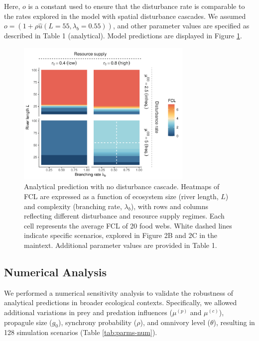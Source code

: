 \documentclass[11pt, class=article, crop=false]{standalone}
\begin{document}
Here, $o$ is a constant used to ensure that the disturbance rate is comparable to the rates explored in the model with spatial disturbance cascades.
We assumed $o = (1 + \rho \hat{u}(L = 55, \lambda_b = 0.55))$, and other parameter values are specified as described in Table 1 (analytical).
Model predictions are displayed in Figure \ref{fig:no-cascade}.

\begin{figure}
\centering
\includegraphics[width=0.75\textwidth]{../data_fmt/fig_rho0.pdf}
\caption{Analytical prediction with no disturbance cascade. Heatmaps of
FCL are expressed as a function of ecosystem size (river length, \(L\))
and complexity (branching rate, \(\lambda_b\)), with rows and columns
reflecting different disturbance and resource supply regimes. Each cell
represents the average FCL of 20 food webs. White dashed lines indicate
specific scenarios, explored in Figure 2B and 2C in the maintext.
Additional parameter values are provided in Table 1.}
\label{fig:no-cascade}
\end{figure}

\newpage

\subsection{Numerical Analysis}

We performed a numerical sensitivity analysis to validate the robustness of analytical predictions in broader ecological contexts.
Specifically, we allowed additional variations in prey and predation influences ($\mu^{(p)}$ and $\mu^{(c)}$), propagule size ($g_0$), synchrony probability ($\rho$), and omnivory level ($\theta$), resulting in 128 simulation scenarios (Table \ref{tab:parms-num}).
\end{document}
